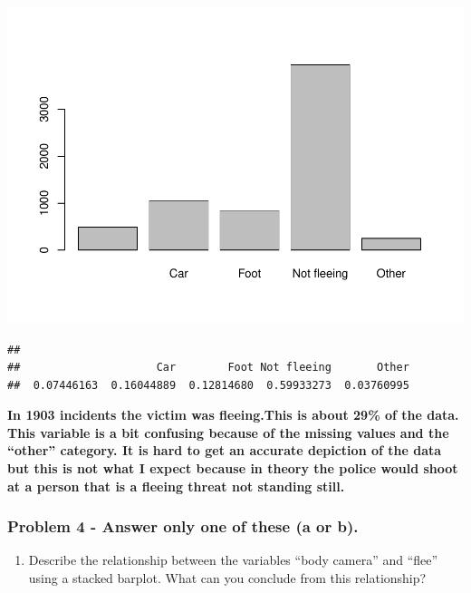 \documentclass[
]{article}
\newenvironment{Shaded}{\begin{snugshade}}{\end{snugshade}}
\newcommand{\FunctionTok}[1]{\textcolor[rgb]{0.00,0.00,0.00}{#1}}
\newcommand{\NormalTok}[1]{#1}
\newcommand{\SpecialCharTok}[1]{\textcolor[rgb]{0.00,0.00,0.00}{#1}}
\providecommand{\tightlist}{%
  \setlength{\itemsep}{0pt}\setlength{\parskip}{0pt}}
\begin{document}
\includegraphics{Assignments_files/figure-latex/unnamed-chunk-25-1.pdf}

\begin{Shaded}
\end{Shaded}

\begin{verbatim}
## 
##                     Car        Foot Not fleeing       Other 
##  0.07446163  0.16044889  0.12814680  0.59933273  0.03760995
\end{verbatim}

\textbf{In 1903 incidents the victim was fleeing.This is about 29\% of
the data. This variable is a bit confusing because of the missing values
and the ``other'' category. It is hard to get an accurate depiction of
the data but this is not what I expect because in theory the police
would shoot at a person that is a fleeing threat not standing still.}

\hypertarget{problem-4---answer-only-one-of-these-a-or-b.}{%
\subsubsection{Problem 4 - Answer only one of these (a or
b).}\label{problem-4---answer-only-one-of-these-a-or-b.}}

\begin{enumerate}
\def\labelenumi{\alph{enumi}.}
\tightlist
\item
  Describe the relationship between the variables ``body camera'' and
  ``flee'' using a stacked barplot. What can you conclude from this
  relationship?
\end{enumerate}
\end{document}
